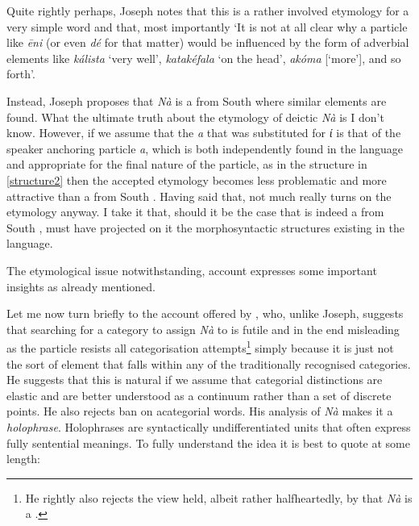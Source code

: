 \documentclass[output=paper]{LSP/langsci}
\begin{document}
Quite rightly perhaps, Joseph notes that this is a rather involved etymology for a very simple word and that, most importantly `It is not at all clear why a particle like \textit{\={e}ni} (or even \textit{d\'e} for that matter) would be influenced by the form of adverbial elements like  \textit{k\'alista} `very well',  \textit{katak\'efala} `on the head',  \textit{akóma} [`more'], and so forth'.

Instead, Joseph proposes that \textit{N\`{a}} is a  from South  where similar elements are found.  What the ultimate truth about the etymology of deictic \textit{N\`{a}} is I don't know.  However, if we assume that the \textit{a} that was substituted for \textit{ί} is that of the speaker anchoring particle \textit{a}, which is both independently found in the language and appropriate for the final nature of the particle, as in the structure in \ref{structure2} then the accepted etymology becomes less problematic and more attractive than a  from South .
Having said that, not much really turns on the etymology anyway.  I take it that, should it be the case that \na is indeed a  from South ,  must have projected on it the morphosyntactic structures existing in the language. 

The etymological issue notwithstanding,  account expresses some important insights as already mentioned.

Let me now turn briefly to the account offered by \citet{christidis:90}, who, unlike Joseph, suggests that searching for a category to assign \textit{N\`{a}} to is futile and in the end misleading as the particle resists all categorisation attempts\footnote{He rightly also rejects the view held, albeit rather halfheartedly, by \citet{Householder-Kazazis-Koutsoudas:64} that \textit{N\`{a}} is a .} simply because it is just not the sort of element that falls within any of the traditionally recognised categories.  He suggests that this is natural if we assume \citep[following][]{ross:72} that categorial distinctions are elastic and are better understood as a continuum rather than a set of discrete points. He also rejects  ban on acategorial words.  His analysis of \textit{N\`{a}} makes it a \textit{holophrase}.  Holophrases are syntactically undifferentiated units that often express fully sentential meanings.  To fully understand the idea it  is best to quote at some length:
\end{document}
